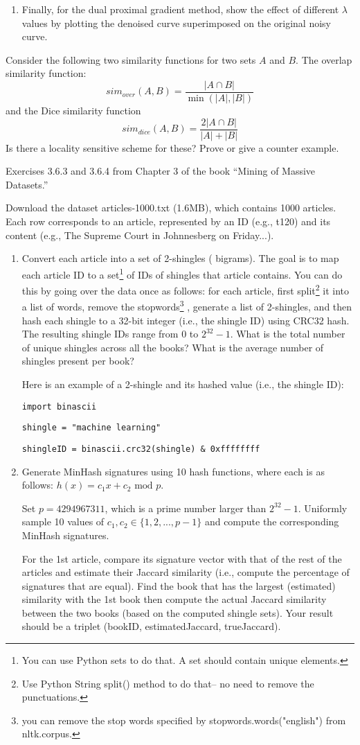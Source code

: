 \documentclass[11pt]{article}
\newcommand{\bi}{\begin{enumerate}}
\newcommand{\ib}{\end{enumerate}}
\newcommand{\p}{\item}
\begin{document}
\begin{enumerate}
\p Finally, for the dual proximal gradient method, show the effect of different $\lambda$ values by plotting the denoised curve superimposed on the original noisy curve.
\ib
\p 	 Consider the following two similarity functions for two sets $A$ and $B$. The overlap similarity function:
$$sim_{over}(A,B)=\frac{|A\cap B|}{\min(|A|,|B|)}$$
and the Dice similarity function
$$sim_{dice}(A,B)=\frac{2|A\cap B|}{|A|+|B|}$$
Is there a locality sensitive scheme for these? Prove or give a counter example.
\p Exercises 3.6.3 and 3.6.4 from Chapter 3 of the book “Mining of Massive Datasets.”
\p Download the dataset articles-1000.txt (1.6MB), which contains 1000 articles. Each row corresponds to an article, represented by an ID (e.g., t120) and its content (e.g., The Supreme Court in Johnnesberg on Friday...).
\bi
\p Convert each article into a set of 2-shingles ( bigrams). The goal is to map each article ID to a set\footnote{You can use Python sets to do that. A set should contain unique elements.} of IDs of  shingles that article contains. 
You can do this by going over the data once as follows: for each article, first split\footnote{Use Python String split() method to do that-- no need to remove the punctuations.} it into a list of words, remove the stopwords\footnote{you can remove the stop words specified by stopwords.words("english") from nltk.corpus.}
, generate a list of 2-shingles, and then hash each shingle
to a 32-bit integer (i.e., the shingle ID) using CRC32 hash. The resulting shingle IDs range from 0 to $2^{32} - 1$. What is the total number of unique shingles across all the books? What is the average number of shingles present per book?

Here is an example of a 2-shingle and its hashed value (i.e., the shingle ID):

{\texttt{import binascii}
		
\texttt{shingle = "machine learning"}

\texttt{shingleID = binascii.crc32(shingle) \& 0xffffffff}
}
\p Generate MinHash signatures using 10 hash functions, where each is as follows:
$h(x) = c_1x + c_2 \text{ mod } p.$

Set $p = 4294967311$, which is a prime number larger than $2^{32} - 1$. Uniformly sample 10 values of $c_1, c_2 \in\{ 1, 2, . . . , p -1\}$ and compute the corresponding MinHash signatures.

For the 1st article, compare its signature vector with that of the rest of the articles and estimate their Jaccard similarity (i.e., compute the percentage of signatures that are equal). Find the book that has the largest (estimated) similarity with the 1st book then compute the actual Jaccard similarity between the two books (based on the computed shingle sets). Your result should be a triplet (bookID, estimatedJaccard, trueJaccard).


\end{enumerate}
\end{document}

